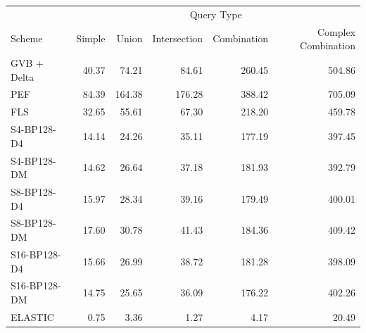 \begin{tabular}{lrrrrr}
\toprule
 & \multicolumn{5}{c}{Query Type} \\
Scheme & Simple & Union & Intersection & Combination & Complex Combination \\
\midrule
GVB + Delta & 40.37 & 74.21 & 84.61 & 260.45 & 504.86 \\
PEF & 84.39 & 164.38 & 176.28 & 388.42 & 705.09 \\
FLS & 32.65 & 55.61 & 67.30 & 218.20 & 459.78 \\
S4-BP128-D4 & 14.14 & 24.26 & 35.11 & 177.19 & 397.45 \\
S4-BP128-DM & 14.62 & 26.64 & 37.18 & 181.93 & 392.79 \\
S8-BP128-D4 & 15.97 & 28.34 & 39.16 & 179.49 & 400.01 \\
S8-BP128-DM & 17.60 & 30.78 & 41.43 & 184.36 & 409.42 \\
S16-BP128-D4 & 15.66 & 26.99 & 38.72 & 181.28 & 398.09 \\
S16-BP128-DM & 14.75 & 25.65 & 36.09 & 176.22 & 402.26 \\
ELASTIC & 0.75 & 3.36 & 1.27 & 4.17 & 20.49 \\
\bottomrule
\end{tabular}
